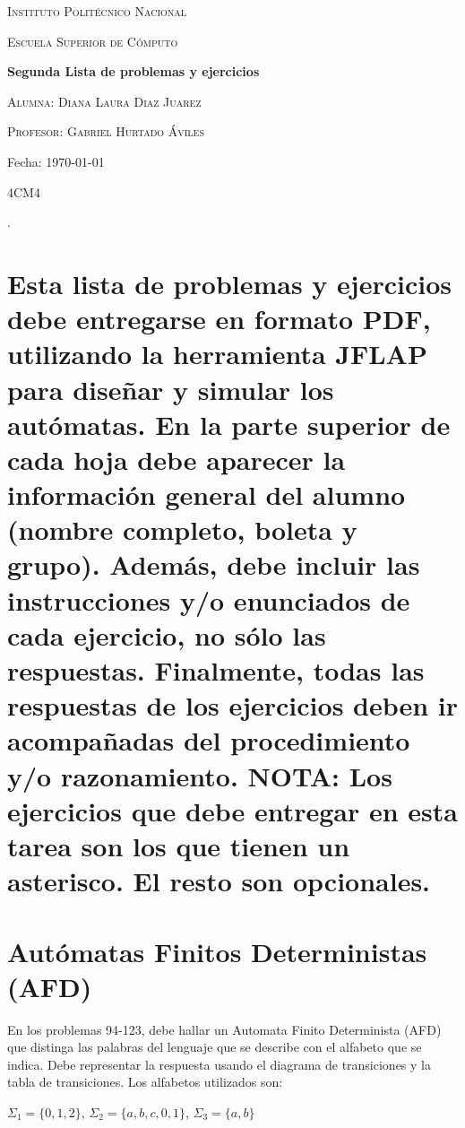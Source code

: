 \documentclass[12pt]{article}
\newcounter{ejercicio}
\begin{document}
\begin{titlepage}
    \centering
    {\LARGE \scshape Instituto Politécnico Nacional} \par \vspace{1cm}
    {\Large \scshape Escuela Superior de Cómputo} \par \vspace{1.5cm}
    {\huge \bfseries Segunda Lista de problemas y ejercicios} \par \vspace{2cm}
    {\Large \scshape Alumna: Diana Laura Diaz Juarez} \par \vspace{0.5cm}
    {\large \scshape Profesor: Gabriel Hurtado Áviles} \par \vspace{2cm}
    {\large Fecha: \today} \par
\begin{center}
    {\large{4CM4}\\}
\end{center}
\end{titlepage}.

\section*{Esta lista de problemas y ejercicios debe entregarse en formato PDF,
utilizando la herramienta JFLAP para diseñar y simular los autómatas.
En la parte superior de cada hoja debe aparecer la información general del
alumno (nombre completo, boleta y grupo). Además, debe incluir las
instrucciones y/o enunciados de cada ejercicio, no sólo las respuestas.
Finalmente, todas las respuestas de los ejercicios deben ir acompañadas del
procedimiento y/o razonamiento.
NOTA: Los ejercicios que debe entregar en esta tarea son los que tienen un
asterisco. El resto son opcionales.}

\section{Autómatas Finitos Deterministas (AFD)}
En los problemas 94-123, debe hallar un Automata Finito Determinista (AFD) que distinga las palabras del lenguaje que se describe con el alfabeto que se indica.
Debe representar la respuesta usando el diagrama de transiciones y la tabla de transiciones. Los alfabetos utilizados son:

$\Sigma_1 = \{0,1,2\}$,  $\Sigma_2 = \{a,b,c,0,1\}$,  $\Sigma_3 = \{a,b\}$
\end{document}
